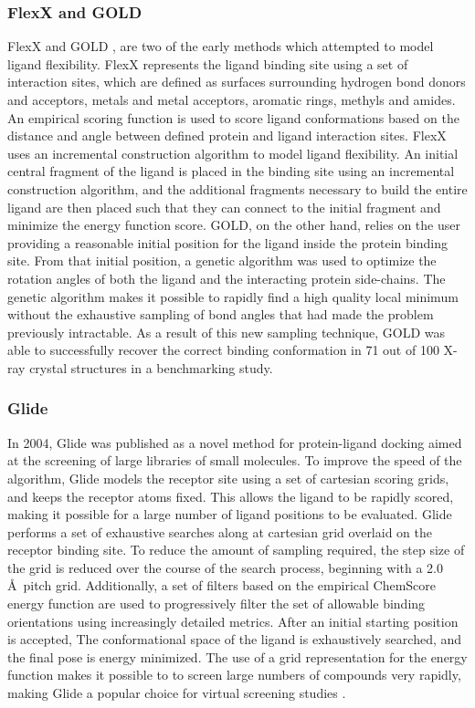 \subsubsection{FlexX and GOLD}
FlexX \citep{Rarey:1996hf} and \ac{GOLD} \citep{Jones:1997bl}, are two of the early methods which attempted to model ligand flexibility.
FlexX represents the ligand binding site using a set of interaction sites, which are defined as surfaces surrounding hydrogen bond donors and acceptors, metals and metal acceptors, aromatic rings, methyls and amides.
An empirical scoring function is used to score ligand conformations based on the distance and angle between defined protein and ligand interaction sites.
FlexX uses an incremental construction algorithm to model ligand flexibility.
An initial central fragment of the ligand is placed in the binding site using an incremental construction algorithm, and the additional fragments necessary to build the entire ligand are then placed such that they can connect to the initial fragment and minimize the energy function score.
\ac{GOLD}, on the other hand, relies on the user providing a reasonable initial position for the ligand inside the protein binding site.
From that initial position, a genetic algorithm \citep{Jones:1995vw} was used to optimize the rotation angles of both the ligand and the interacting protein side-chains.
The genetic algorithm makes it possible to rapidly find a high quality local minimum without the exhaustive sampling of bond angles that had made the problem previously intractable.
As a result of this new sampling technique, \ac{GOLD} was able to successfully recover the correct binding conformation in 71 out of 100 X-ray crystal structures in a benchmarking study.

\subsubsection{Glide}
In 2004, Glide \citep{Friesner:2004hm} was published as a novel method for protein-ligand docking aimed at the screening of large libraries of small molecules.
To improve the speed of the algorithm, Glide models the receptor site using a set of cartesian scoring grids, and keeps the receptor atoms fixed.
This allows the ligand to be rapidly scored, making it possible for a large number of ligand positions to be evaluated.
Glide performs a set of exhaustive searches along at cartesian grid overlaid on the receptor binding site.
To reduce the amount of sampling required, the step size of the grid is reduced over the course of the search process, beginning with a 2.0 \AA\ pitch grid.
Additionally, a set of filters based on the empirical ChemScore \citep{Eldridge:1997tm} energy function are used to progressively filter the set of allowable binding orientations using increasingly detailed metrics.
After an initial starting position is accepted, The conformational space of the ligand is exhaustively searched, and the final pose is energy minimized.
The use of a grid representation for the energy function makes it possible to to screen large numbers of compounds very rapidly, making Glide a popular choice for virtual screening studies \citep{Yilmaz:2013dj,Bauer:2013de}.

